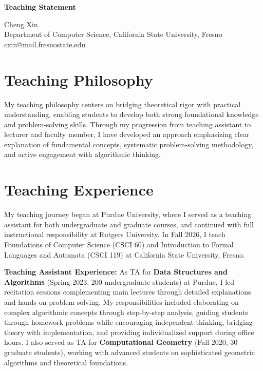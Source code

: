 \documentclass[11pt,letterpaper]{article}
\begin{document}
\begin{center}
    {\Large\textbf{Teaching Statement}}

    Cheng Xin\\
    Department of Computer Science, California State University, Fresno\\
    \href{mailto:cxin@mail.fresnostate.edu}{cxin@mail.fresnostate.edu}
\end{center}

\vspace{-8pt}

\section*{Teaching Philosophy}

My teaching philosophy centers on bridging theoretical rigor with practical understanding, enabling students to develop both strong foundational knowledge and problem-solving skills. Through my progression from teaching assistant to lecturer and faculty member, I have developed an approach emphasizing clear explanation of fundamental concepts, systematic problem-solving methodology, and active engagement with algorithmic thinking.

\section*{Teaching Experience}

My teaching journey began at Purdue University, where I served as a teaching assistant for both undergraduate and graduate courses, and continued with full instructional responsibility at Rutgers University. In Fall 2026, I teach Foundations of Computer Science (CSCI 60) and Introduction to Formal Languages and Automata (CSCI 119) at California State University, Fresno.

\textbf{Teaching Assistant Experience:} As TA for \textbf{Data Structures and Algorithms} (Spring 2023, 200 undergraduate students) at Purdue, I led recitation sessions complementing main lectures through detailed explanations and hands-on problem-solving. My responsibilities included elaborating on complex algorithmic concepts through step-by-step analysis, guiding students through homework problems while encouraging independent thinking, bridging theory with implementation, and providing individualized support during office hours. I also served as TA for \textbf{Computational Geometry} (Fall 2020, 30 graduate students), working with advanced students on sophisticated geometric algorithms and theoretical foundations.
\end{document}
